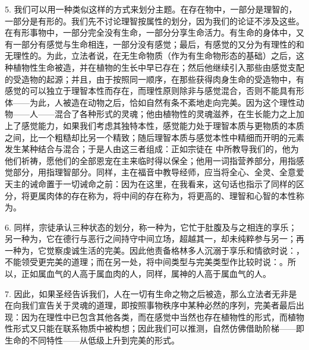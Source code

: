 5. 我们可以用一种类似这样的方式来划分主题。在存在物中，一部分是理智的，一部分是有形的。我们先不讨论理智按属性的划分，因为我们的论证不涉及这些。在有形事物中，一部分完全没有生命，一部分分享生命活力。有生命的身体中，又有一部分有感觉与生命相连，一部分没有感觉；最后，有感觉的又分为有理性的和无理性的。为此，立法者说，在无生命物质（作为有生命物形态的基础）之后，这种植物性生命被造，并在植物的生长中早已存在；然后他继续引入那些由感觉支配的受造物的起源；并且，由于按照同一顺序，在那些获得肉身生命的受造物中，有感觉的可以独立于理智本性而存在，而理性原则除非与感觉混合，否则不能具有形体——为此，人被造在动物之后，恰如自然有条不紊地走向完美。因为这个理性动物——人——混合了各种形式的灵魂；他由植物性的灵魂滋养，在生长能力之上加上了感觉能力，如果我们考虑其独特本性，感觉能力处于理智本质与更物质的本质之间，比一个粗糙却比另一个精致；随后理智本质与感觉本性中精细而开明的元素发生某种结合与混合；于是人由这三者组成：正如宗徒在  中所教导我们的，他为他们祈祷，愿他们的全部恩宠在主来临时得以保全；他用一词指营养部分，用指感觉部分，用指理智部分。同样，主在福音中教导经师，应当将全心、全灵、全意爱天主的诫命置于一切诫命之前：因为在这里，在我看来，这句话也指示了同样的区分，将更属肉体的存在称为，将中间的存在称为，将更高的、理智和心智的本性称为。\par

6. 同样，宗徒承认三种状态的划分，称一种为，它忙于肚腹及与之相连的享乐；另一种为，它在德行与恶行之间持守中间立场，超越其一，却未纯粹参与另一；再一种为，它觉察虔诚生活的完美。因此他责备格林多人沉溺于享乐和情欲时说：，不能领受更完美的道理；而在另一处，将中间类型与完美类型作比较时说：。所以，正如属血气的人高于属血肉的人，同样，属神的人高于属血气的人。\par

7. 因此，如果圣经告诉我们，人在一切有生命之物之后被造，那么立法者无非是在向我们宣告关于灵魂的道理，即按照事物秩序中某种必然的序列，完美者最后出现：因为在理性中已包含其他各类，而在感觉中当然也存在植物性的形式，而植物性形式又只能在联系物质中被构想；因此我们可以推测，自然仿佛借助阶梯——即生命的不同特性——从低级上升到完美的形式。\par

